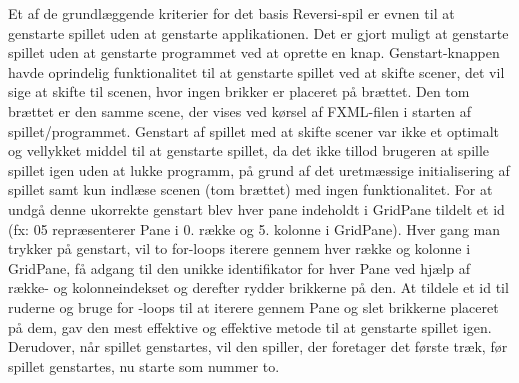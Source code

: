 Et af de grundlæggende kriterier for det basis Reversi-spil er evnen til at genstarte spillet uden at genstarte applikationen. Det er gjort muligt at genstarte spillet uden at genstarte programmet ved at oprette en knap. Genstart-knappen havde oprindelig funktionalitet til at genstarte spillet ved at skifte scener, det vil sige at skifte til scenen, hvor ingen brikker er placeret på brættet. Den tom brættet er den samme scene, der vises ved kørsel af FXML-filen i starten af spillet/programmet. Genstart af spillet med at skifte scener var ikke et optimalt og vellykket middel til at genstarte spillet, da det ikke tillod brugeren at spille spillet igen uden at lukke programm, på grund af det uretmæssige initialisering af spillet samt kun indlæse scenen (tom brættet) med ingen funktionalitet. \newline
\newline
For at undgå denne ukorrekte genstart blev hver pane indeholdt i GridPane tildelt et id (fx: 05 repræsenterer Pane i 0. række og 5. kolonne i GridPane). Hver gang man trykker på genstart, vil to for-loops iterere gennem hver række og kolonne i GridPane, få adgang til den unikke identifikator for hver Pane ved hjælp af række- og kolonneindekset og derefter rydder brikkerne  på den. At tildele et id til ruderne og bruge for -loops til at iterere gennem Pane og slet brikkerne placeret på dem, gav den mest effektive og effektive metode til at genstarte spillet igen. Derudover, når spillet genstartes, vil den spiller, der foretager det første træk, før spillet genstartes, nu starte som nummer to.

